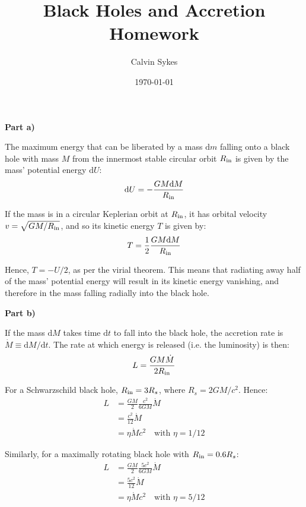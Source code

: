 \documentclass{article}
\title{Black Holes and Accretion Homework}
\author{Calvin Sykes}
\date{\today}
\newcommand{\diff}[1]{\mathrm{d}#1}
\newcommand{\Rin}{\ensuremath R_{\mathrm{in}}}
\newcommand{\mysection}[1]{{\large{\bf #1}}}
\begin{document}
\maketitle

\mysection{Part a)}

The maximum energy that can be liberated by a mass $\diff{m}$ falling onto a black hole with mass $M$ from the innermost stable circular orbit $\Rin$ is given by the mass' potential energy $\diff{U}$:
\begin{equation}
  \label{eq:maxe}
  \diff{U}=-\frac{GM\diff{M}}{\Rin}
\end{equation}

If the mass is in a circular Keplerian orbit at $\Rin$, it has orbital velocity $v=\sqrt{GM/\Rin}$, and so its kinetic energy $T$ is given by:
\begin{equation}
  \label{eq:kine}
  T=\frac{1}{2}\frac{GM\diff{M}}{\Rin}
\end{equation}

Hence, $T=-U/2$, as per the virial theorem. This means that radiating away half of the mass' potential energy will result in its kinetic energy vanishing, and therefore in the mass falling radially into the black hole.

\vspace{\baselineskip}
\mysection{Part b)}

If the mass $\diff{M}$ takes time $\diff{t}$ to fall into the black hole, the accretion rate is $\dot{M}\equiv\diff{M}/\diff{t}$. The rate at which energy is released (i.e. the luminosity) is then:
\begin{equation}
  \label{eq:lum}
  L=\frac{GM\dot{M}}{2\Rin}
\end{equation}

For a Schwarzschild black hole, $\Rin=3R_s$, where $R_s=2GM/c^2$. Hence:
\begin{align}
  L&=\frac{GM}{2}\frac{c^2}{6GM}\dot{M}\\
   &=\frac{c^2}{12}\dot{M}\\
   &=\eta\dot{M}c^2\quad\text{with }\eta=1/12
\end{align}

Similarly, for a maximally rotating black hole with $\Rin=0.6R_s$:
\begin{align}
  L&=\frac{GM}{2}\frac{5c^2}{6GM}\dot{M}\\
   &=\frac{5c^2}{12}\dot{M}\\
   &=\eta\dot{M}c^2\quad\text{with }\eta=5/12
\end{align}
\end{document}
